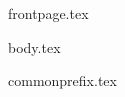 \documentclass[11pt]{llncs}
\begin{document}
{frontpage.tex}

{body.tex}

\vfill
\pagebreak
\iflncs
\thispagestyle{plain}
\fi

\ifccs
  
\else
  
\fi



{commonprefix.tex}
\end{document}
